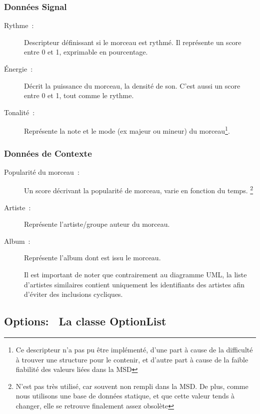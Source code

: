 \subsubsection{Données Signal}

\begin{description}
  \item[Rythme~:] Descripteur définissant si le morceau est rythmé. Il
  représente un score entre 0 et 1, exprimable en pourcentage.
  \item[Énergie~:] Décrit la puissance du morceau, la densité de son. C'est
  aussi un score entre 0 et 1, tout comme le rythme.
  \item[Tonalité~:] Représente la note et le mode (ex majeur ou mineur) du 
  morceau\footnote{Ce descripteur n'a pas pu être implémenté, d'une part à
  cause de la difficulté à trouver une structure pour le contenir, et d'autre
  part à cause de la faible fiabilité des valeurs liées dans la MSD}.
\end{description}

\subsubsection{Données de Contexte}

\begin{description}
  \item[Popularité du morceau~:] Un score décrivant la popularité de morceau,
  varie en fonction du temps.
  \footnote{N'est pas très utilisé, car souvent non rempli dans la MSD. De
  plus, comme nous utilisons une base de données statique, et que cette valeur
  tends à changer, elle se retrouve finalement assez obsolète}

  \item[Artiste~:] Représente l'artiste/groupe auteur du morceau.

  \item[Album~:] Représente l'album dont est issu le morceau.

  Il est important de noter que contrairement au diagramme UML, la liste
  d'artistes similaires contient uniquement les identifiants des artistes 
  afin d'éviter des inclusions cycliques.
\end{description}

\subsection{Options:~ La classe OptionList}
\label{archi:communication:options}

